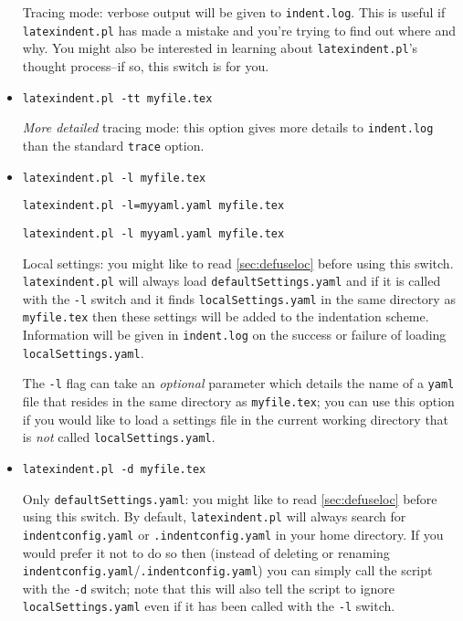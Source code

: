 \documentclass[11pt]{article}
\newcommand{\verbitem}[1]{\small\PVerb{#1}}
\begin{document}
\begin{itemize}[labelsep=.25cm]
	      \label{page:traceswitch}
	      Tracing mode: verbose output will be given to \lstinline!indent.log!. This
	      is useful if \lstinline!latexindent.pl! has made a mistake and you're
	      trying to find out where and why. You might also be interested in learning
	      about \lstinline!latexindent.pl!'s thought process--if so, this
	      switch is for you.
	\item[\verbitem{-tt, --ttrace}] \lstinline!latexindent.pl -tt myfile.tex!

      \emph{More detailed} tracing mode: this option gives more details to \lstinline!indent.log!
      than the standard \lstinline!trace! option.
	\item[\verbitem{-l, --local[=myyaml.yaml]}] \lstinline!latexindent.pl -l myfile.tex!

\lstinline!latexindent.pl -l=myyaml.yaml myfile.tex!

\lstinline!latexindent.pl -l myyaml.yaml myfile.tex!


	      \label{page:localswitch}
	      Local settings: you might like to read \cref{sec:defuseloc} before
	      using this switch. \lstinline!latexindent.pl! will always load \lstinline!defaultSettings.yaml!
	      and if it is called with the \lstinline!-l! switch and it finds \lstinline!localSettings.yaml!
	      in the same directory as \lstinline!myfile.tex! then these settings will be
	      added to the indentation scheme. Information will be given in \lstinline!indent.log! on
	      the success or failure of loading \lstinline!localSettings.yaml!.

The \lstinline!-l! flag can take an \emph{optional} parameter which details the name of a \lstinline!yaml! file
that resides in the same directory as \lstinline!myfile.tex!; you can use this option if you would 
like to load a settings file in the current working directory that is \emph{not} called \lstinline!localSettings.yaml!.

	\item[\verbitem{-d, --onlydefault}] \lstinline!latexindent.pl -d myfile.tex!

	      Only \lstinline!defaultSettings.yaml!: you might like to read \cref{sec:defuseloc} before
	      using this switch. By default, \lstinline!latexindent.pl! will always search for
	      \lstinline!indentconfig.yaml! or \lstinline!.indentconfig.yaml!  in your home directory. If you would prefer it not to do so
	      then (instead of deleting or renaming \lstinline!indentconfig.yaml!/\lstinline!.indentconfig.yaml!) you can simply
	      call the script with the \lstinline!-d! switch; note that this will also tell
	      the script to ignore \lstinline!localSettings.yaml! even if it has been called with the
	      \lstinline!-l! switch.


\end{itemize}
\end{document}
